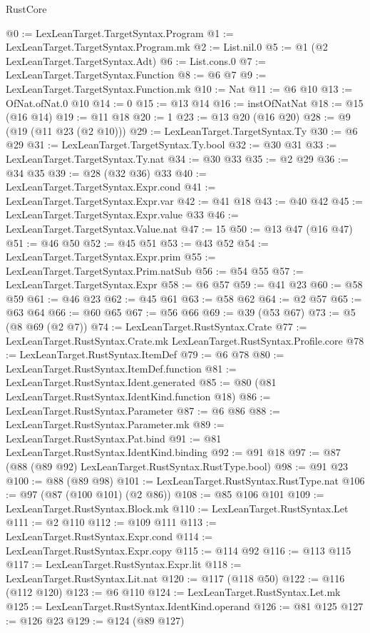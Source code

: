 \begin{lexlean}{RustCore}
\begin{coremodule}
@0 := LexLeanTarget.TargetSyntax.Program
@1 := LexLeanTarget.TargetSyntax.Program.mk
@2 := List.nil.{0}
@5 := @1 (@2 LexLeanTarget.TargetSyntax.Adt)
@6 := List.cons.{0}
@7 := LexLeanTarget.TargetSyntax.Function
@8 := @6 @7
@9 := LexLeanTarget.TargetSyntax.Function.mk
@10 := Nat
@11 := @6 @10
@13 := OfNat.ofNat.{0} @10
@14 := 0
@15 := @13 @14
@16 := instOfNatNat
@18 := @15 (@16 @14)
@19 := @11 @18
@20 := 1
@23 := @13 @20 (@16 @20)
@28 := @9 (@19 (@11 @23 (@2 @10)))
@29 := LexLeanTarget.TargetSyntax.Ty
@30 := @6 @29
@31 := LexLeanTarget.TargetSyntax.Ty.bool
@32 := @30 @31
@33 := LexLeanTarget.TargetSyntax.Ty.nat
@34 := @30 @33
@35 := @2 @29
@36 := @34 @35
@39 := @28 (@32 @36) @33
@40 := LexLeanTarget.TargetSyntax.Expr.cond
@41 := LexLeanTarget.TargetSyntax.Expr.var
@42 := @41 @18
@43 := @40 @42
@45 := LexLeanTarget.TargetSyntax.Expr.value @33
@46 := LexLeanTarget.TargetSyntax.Value.nat
@47 := 15
@50 := @13 @47 (@16 @47)
@51 := @46 @50
@52 := @45 @51
@53 := @43 @52
@54 := LexLeanTarget.TargetSyntax.Expr.prim
@55 := LexLeanTarget.TargetSyntax.Prim.natSub
@56 := @54 @55
@57 := LexLeanTarget.TargetSyntax.Expr
@58 := @6 @57
@59 := @41 @23
@60 := @58 @59
@61 := @46 @23
@62 := @45 @61
@63 := @58 @62
@64 := @2 @57
@65 := @63 @64
@66 := @60 @65
@67 := @56 @66
@69 := @39 (@53 @67)
@73 := @5 (@8 @69 (@2 @7))
@74 := LexLeanTarget.RustSyntax.Crate
@77 := LexLeanTarget.RustSyntax.Crate.mk LexLeanTarget.RustSyntax.Profile.core
@78 := LexLeanTarget.RustSyntax.ItemDef
@79 := @6 @78
@80 := LexLeanTarget.RustSyntax.ItemDef.function
@81 := LexLeanTarget.RustSyntax.Ident.generated
@85 := @80 (@81 LexLeanTarget.RustSyntax.IdentKind.function @18)
@86 := LexLeanTarget.RustSyntax.Parameter
@87 := @6 @86
@88 := LexLeanTarget.RustSyntax.Parameter.mk
@89 := LexLeanTarget.RustSyntax.Pat.bind
@91 := @81 LexLeanTarget.RustSyntax.IdentKind.binding
@92 := @91 @18
@97 := @87 (@88 (@89 @92) LexLeanTarget.RustSyntax.RustType.bool)
@98 := @91 @23
@100 := @88 (@89 @98)
@101 := LexLeanTarget.RustSyntax.RustType.nat
@106 := @97 (@87 (@100 @101) (@2 @86))
@108 := @85 @106 @101
@109 := LexLeanTarget.RustSyntax.Block.mk
@110 := LexLeanTarget.RustSyntax.Let
@111 := @2 @110
@112 := @109 @111
@113 := LexLeanTarget.RustSyntax.Expr.cond
@114 := LexLeanTarget.RustSyntax.Expr.copy
@115 := @114 @92
@116 := @113 @115
@117 := LexLeanTarget.RustSyntax.Expr.lit
@118 := LexLeanTarget.RustSyntax.Lit.nat
@120 := @117 (@118 @50)
@122 := @116 (@112 @120)
@123 := @6 @110
@124 := LexLeanTarget.RustSyntax.Let.mk
@125 := LexLeanTarget.RustSyntax.IdentKind.operand
@126 := @81 @125
@127 := @126 @23
@129 := @124 (@89 @127)

\end{coremodule}
\end{lexlean}
